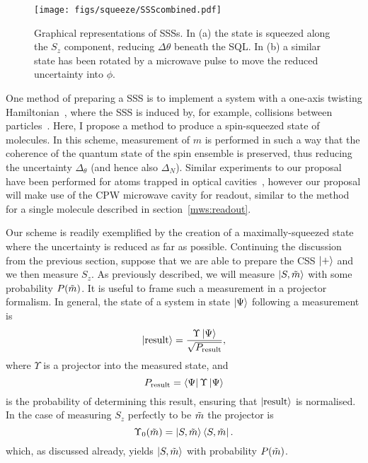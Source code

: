 \begin{figure}[ht]
  \centering
    \texttt{[image: figs/squeeze/SSScombined.pdf]}
    \caption[Graphical representation of a spin-squeezed state]{
      Graphical representations of SSSs. In (a) the state is squeezed along the
      $S_z$ component, reducing $\Delta\theta$ beneath the SQL. In (b) a
      similar state has been rotated by a microwave pulse to move the reduced
      uncertainty into $\phi$. 
  }
  \label{squeeze:fig:SSS}
\end{figure}

One method of preparing a SSS is to implement a system with a one-axis twisting
Hamiltonian~\cite{PhysRevLett.94.023003}, where the SSS is induced by, for
example, collisions between particles~\cite{Jin_2009}. Here, I propose a method
to produce a spin-squeezed state of molecules.  In this scheme, measurement of
$m$ is performed in such a way that the coherence of the quantum state of the
spin ensemble is preserved, thus reducing the uncertainty $\Delta_\theta$ (and
hence also $\Delta_N$).  Similar experiments to our proposal have been
performed for atoms trapped in optical cavities~\cite{Cox2016,
SchleierSmith2011}, however our proposal will make use of the CPW microwave
cavity for readout, similar to the method for a single molecule described in
section~\ref{mws:readout}.


Our scheme is readily exemplified by the creation of a maximally-squeezed state
where the uncertainty is reduced as far as possible.  Continuing the discussion
from the previous section, suppose that we are able to prepare the CSS
$\ket{+}$ and we then measure $S_z$. As previously described, we will measure
$\ket{S, \tilde{m}}$ with some probability $P(\tilde{m})$. It is useful to frame
such a measurement in a projector formalism. In general, the state of a system
in state $\ket{\Psi}$ following a measurement is~\cite{gerry_knight_2004}
%
\begin{equation}
  \ket{\text{result}} = \frac{\Upsilon\ket{\Psi}}{\sqrt{P_\text{result}}},
  \label{squeeze:eqn:projresult}
\end{equation}
%
where $\Upsilon$ is a projector into the measured state, and
%
\begin{equation}
  P_\text{result} = \bra{\Psi}\Upsilon\ket{\Psi}
\end{equation}
%
is the probability of determining this result, ensuring that
$\ket{\text{result}}$ is normalised. In the case of measuring $S_z$ perfectly
to be $\tilde{m}$ the projector is 
%
\begin{equation}
  \Upsilon_0(\tilde{m}) = \ket{S, \tilde{m}}\bra{S, \tilde{m}}.
\end{equation}
%
which, as discussed already, yields $\ket{S,\tilde{m}}$ with probability
$P(\tilde{m})$.

